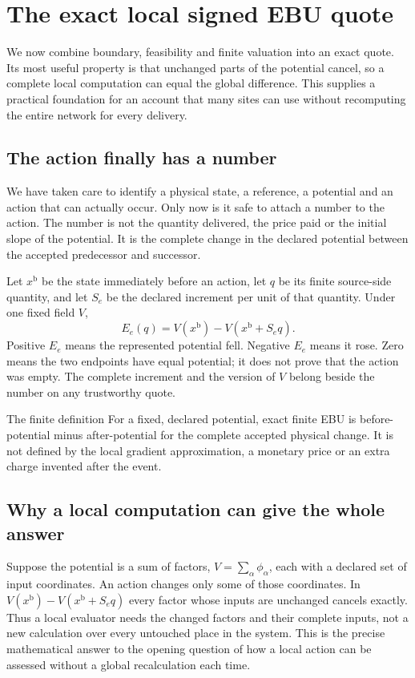 \chapter{The exact local signed EBU quote}\label{ch:quote}

We now combine boundary, feasibility and finite valuation into an exact quote. Its most useful property is that unchanged parts of the potential cancel, so a complete local computation can equal the global difference. This supplies a practical foundation for an account that many sites can use without recomputing the entire network for every delivery.


\section{The action finally has a number}
We have taken care to identify a physical state, a reference, a potential and
an action that can actually occur. Only now is it safe to attach a number to
the action. The number is not the quantity delivered, the price paid or the
initial slope of the potential. It is the complete change in the declared
potential between the accepted predecessor and successor.

Let $x^{\mathrm{b}}$ be the state immediately before an action, let $q$ be its finite
source-side quantity, and let $S_e$ be the declared increment per unit of
that quantity. Under one fixed field $V$,
\begin{equation}\label{eq:exact-local-ebu}
 E_e(q)=V(x^{\mathrm{b}})-V(x^{\mathrm{b}}+S_e q).
\end{equation}
Positive $E_e$ means the represented potential fell. Negative $E_e$ means it
rose. Zero means the two endpoints have equal potential; it does not prove
that the action was empty. The complete increment and the version of $V$
belong beside the number on any trustworthy quote.

\begin{lawbox}{The finite definition}
For a fixed, declared potential, exact finite EBU is before-potential minus
after-potential for the complete accepted physical change. It is not defined
by the local gradient approximation, a monetary price or an extra charge
invented after the event.
\end{lawbox}

\section{Why a local computation can give the whole answer}
Suppose the potential is a sum of factors, $V=\sum_\alpha\phi_\alpha$, each
with a declared set of input coordinates. An action changes only some of
those coordinates. In $V(x^{\mathrm{b}})-V(x^{\mathrm{b}}+S_eq)$ every factor whose inputs are unchanged
cancels exactly. Thus a local evaluator needs the changed factors and their
complete inputs, not a new calculation over every untouched place in the
system. This is the precise mathematical answer to the opening question of
how a local action can be assessed without a global recalculation each time.


